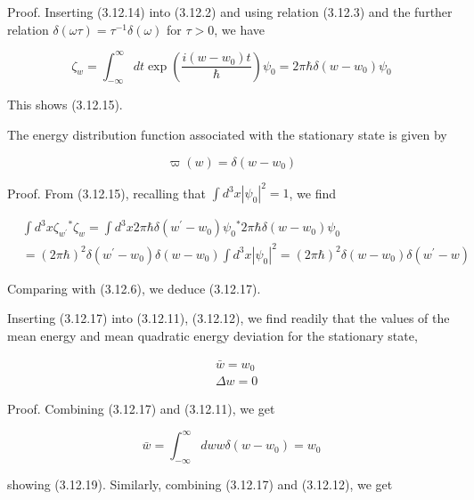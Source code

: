 \documentclass{article}
\begin{document}
Proof. Inserting (3.12.14) into (3.12.2) and using relation (3.12.3) and the further relation $\delta(\omega \tau)=\tau^{-1} \delta(\omega)$ for $\tau>0$, we have
 
\begin{equation*}
\zeta_{w}=\int_{-\infty}^{\infty} d t \exp \left(\frac{i\left(w-w_{0}\right) t}{\hbar}\right) \psi_{0}=2 \pi \hbar \delta\left(w-w_{0}\right) \psi_{0} \tag{3.12.16}
\end{equation*}
 

This shows (3.12.15).

The energy distribution function associated with the stationary state is given by
 
\begin{equation*}
\varpi(w)=\delta\left(w-w_{0}\right) \tag{3.12.17}
\end{equation*}
 

Proof. From (3.12.15), recalling that $\int d^{3} x\left|\psi_{0}\right|^{2}=1$, we find
 
\begin{align*}
& \int d^{3} x \zeta_{w^{\prime}}{ }^{*} \zeta_{w}=\int d^{3} x 2 \pi \hbar \delta\left(w^{\prime}-w_{0}\right) \psi_{0}{ }^{*} 2 \pi \hbar \delta\left(w-w_{0}\right) \psi_{0}  \tag{3.12.18}\\
& =(2 \pi \hbar)^{2} \delta\left(w^{\prime}-w_{0}\right) \delta\left(w-w_{0}\right) \int d^{3} x\left|\psi_{0}\right|^{2}=(2 \pi \hbar)^{2} \delta\left(w-w_{0}\right) \delta\left(w^{\prime}-w\right)
\end{align*}
 

Comparing with (3.12.6), we deduce (3.12.17).

Inserting (3.12.17) into (3.12.11), (3.12.12), we find readily that the values of the mean energy and mean quadratic energy deviation for the stationary state,
 
\begin{align*}
& \bar{w}=w_{0}  \tag{3.12.19}\\
& \Delta w=0 \tag{3.12.20}
\end{align*}
 

Proof. Combining (3.12.17) and (3.12.11), we get
 
\begin{equation*}
\bar{w}=\int_{-\infty}^{\infty} d w w \delta\left(w-w_{0}\right)=w_{0} \tag{3.12.21}
\end{equation*}
 
showing (3.12.19). Similarly, combining (3.12.17) and (3.12.12), we get
 
\end{document}
